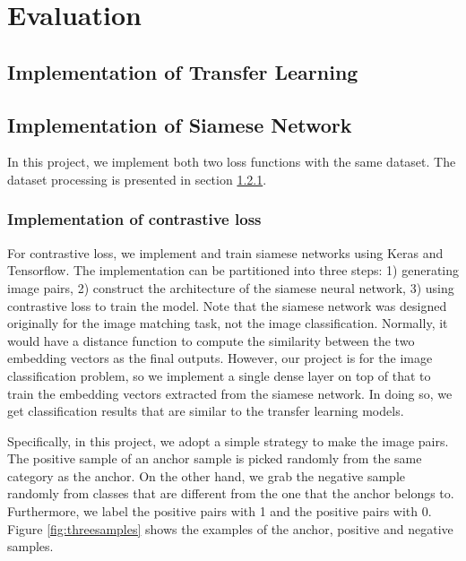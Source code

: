 \section{Evaluation}

\subsection{Implementation of Transfer Learning}

\subsection{Implementation of Siamese Network}

In this project, we implement both two loss functions with the same dataset. The dataset processing is presented in section \ref{}. 

\subsubsection{Implementation of contrastive loss}
For contrastive loss, we implement and train siamese networks using Keras and Tensorflow. The implementation can be partitioned into three steps: 1) generating image pairs, 2) construct the architecture of the siamese neural network, 3) using contrastive loss to train the model. Note that the siamese network was designed originally for the image matching task, not the image classification. Normally, it would have a distance function to compute the similarity between the two embedding vectors as the final outputs. However, our project is for the image classification problem, so we implement a single dense layer on top of that to train the embedding vectors extracted from the siamese network. In doing so, we get classification results that are similar to the transfer learning models. 

Specifically, in this project, we adopt a simple strategy to make the image pairs. The positive sample of an anchor sample is picked randomly from the same category as the anchor. On the other hand, we grab the negative sample randomly from classes that are different from the one that the anchor belongs to. Furthermore, we label the positive pairs with 1 and the positive pairs with 0. Figure \ref{fig:threesamples} shows the examples of the anchor, positive and negative samples. 

